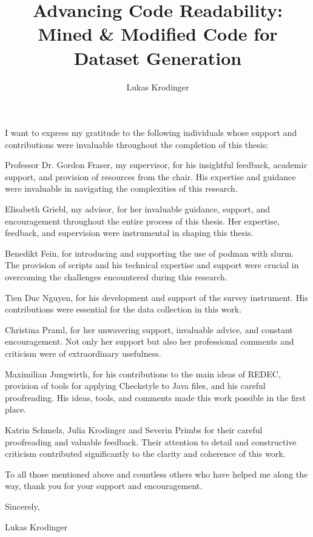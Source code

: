 \documentclass[%
class=scrreprt,
chapterprefix=false,%
open=right,%
twoside=true,%
paper=a4,%
logofile={Logo\_zentral\_farbig\_EN.png},%
thesistype=master,%
UKenglish,%
]{se2thesis}
\author{Lukas Krodinger}
\title{Advancing Code Readability: Mined \& Modified Code for Dataset Generation}
\institute{Chair of Software Engineering II}
\theoremstyle{definition}
\begin{document}
	
	\frontmatter
	
	\maketitle
	
	\begin{acknowledgements}
		I want to express my gratitude to the following individuals whose support and contributions were invaluable throughout the completion of this thesis:
		
		Professor Dr. Gordon Fraser, my supervisor, for his insightful feedback, academic support, and provision of resources from the chair. His expertise and guidance were invaluable in navigating the complexities of this research.
		
		Elisabeth Griebl, my advisor, for her invaluable guidance, support, and encouragement throughout the entire process of this thesis. Her expertise, feedback, and supervision were instrumental in shaping this thesis.
		
		Benedikt Fein, for introducing and supporting the use of podman with slurm. The provision of scripts and his technical expertise and support were crucial in overcoming the challenges encountered during this research.
		
		Tien Duc Nguyen, for his development and support of the survey instrument. His contributions were essential for the data collection in this work.
		
		Christina Praml, for her unwavering support, invaluable advice, and constant encouragement. Not only her support but also her professional comments and criticism were of extraordinary usefulness.
		
		Maximilian Jungwirth, for his contributions to the main ideas of REDEC, provision of tools for applying Checkstyle to Java files, and his careful proofreading. His ideas, tools, and comments made this work possible in the first place.
			
		Katrin Schmelz, Julia Krodinger and Severin Primbs for their careful proofreading and valuable feedback. Their attention to detail and constructive criticism contributed significantly to the clarity and coherence of this work.
		
		To all those mentioned above and countless others who have helped me along the way, thank you for your support and encouragement.
		
		Sincerely,

		Lukas Krodinger
	\end{acknowledgements}
	
\end{document}
